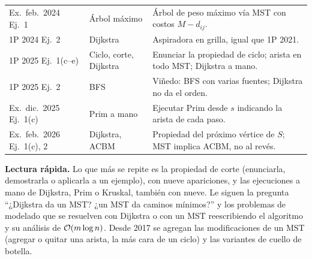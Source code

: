 \begin{center}
\begin{tabularx}{\textwidth}{@{}>{\raggedright\arraybackslash}p{2.8cm}>{\raggedright\arraybackslash}p{2.4cm}>{\raggedright\arraybackslash}X@{}}
Ex.\ feb.~2024 Ej.~1 & Árbol máximo & Árbol de peso máximo vía MST con costos $M-d_{ij}$. \\
1P 2024 Ej.~2 & Dijkstra & Aspiradora en grilla, igual que 1P 2021. \\
1P 2025 Ej.~1(c--e) & Ciclo, corte, Dijkstra & Enunciar la propiedad de ciclo; arista en todo MST; Dijkstra a mano. \\
1P 2025 Ej.~2 & BFS & Viñedo: BFS con varias fuentes; Dijkstra no da el orden. \\
Ex.\ dic.~2025 Ej.~1(c) & Prim a mano & Ejecutar Prim desde $s$ indicando la arista de cada paso. \\
Ex.\ feb.~2026 Ej.~1(c), 2 & Dijkstra, ACBM & Propiedad del próximo vértice de $S$; MST implica ACBM, no al revés. \\
\bottomrule
\end{tabularx}
\end{center}

\textbf{Lectura rápida.} Lo que más se repite es la propiedad de corte (enunciarla, demostrarla o aplicarla a un ejemplo), con nueve apariciones, y las ejecuciones a mano de Dijkstra, Prim o Kruskal, también con nueve. Le siguen la pregunta ``¿Dijkstra da un MST? ¿un MST da caminos mínimos?'' y los problemas de modelado que se resuelven con Dijkstra o con un MST reescribiendo el algoritmo y su análisis de $\mathcal{O}(m\log n)$. Desde 2017 se agregan las modificaciones de un MST (agregar o quitar una arista, la más cara de un ciclo) y las variantes de cuello de botella.
